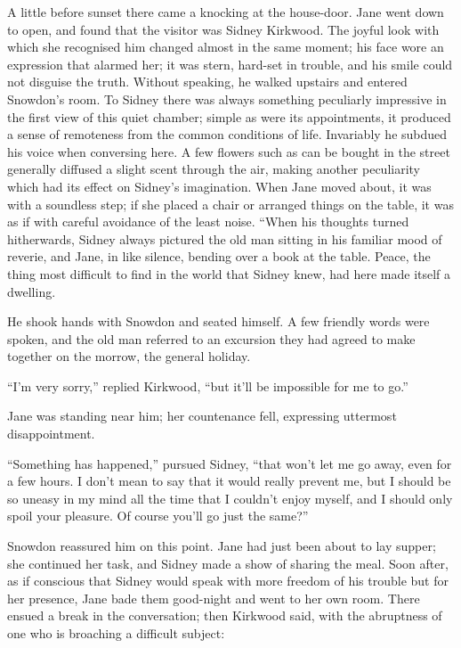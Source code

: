 A little before sunset there came a knocking at the house-door. Jane
went down to open, and found that the visitor was Sidney Kirkwood. The
joyful look with which she recognised him changed almost in the same
moment; his face wore an expression that alarmed her; it was stern,
hard-set in trouble, and his smile could not disguise the truth. Without
speaking, he walked upstairs and entered Snowdon's room. To Sidney there
was always something peculiarly impressive in the first view of this
quiet chamber; simple as were its appointments, it produced a sense {}of
remoteness from the common conditions of life. Invariably he subdued his
voice when conversing here. A few flowers such as can be bought in the
street generally diffused a slight scent through the air, making another
peculiarity which had its effect on Sidney's imagination. When Jane
moved about, it was with a soundless step; if she placed a chair or
arranged things on the table, it was as if with careful avoidance of the
least noise. ``When his thoughts turned hitherwards, Sidney always
pictured the old man sitting in his familiar mood of reverie, and Jane,
in like silence, bending over a book at the table. Peace, the thing most
difficult to find in the world that Sidney knew, had here made itself a
dwelling.

He shook hands with Snowdon and seated himself. A few friendly words
were spoken, and the old man referred to an excursion they had agreed to
make together on the morrow, the general holiday.

``I'm very sorry,'' replied Kirkwood, ``but it'll be impossible for me
to go.''

{}Jane was standing near him; her countenance fell, expressing uttermost
disappointment.

``Something has happened,'' pursued Sidney, ``that won't let me go away,
even for a few hours. I don't mean to say that it would really prevent
me, but I should be so uneasy in my mind all the time that I couldn't
enjoy myself, and I should only spoil your pleasure. Of course you'll go
just the same?''

Snowdon reassured him on this point. Jane had just been about to lay
supper; she continued her task, and Sidney made a show of sharing the
meal. Soon after, as if conscious that Sidney would speak with more
freedom of his trouble but for her presence, Jane bade them good-night
and went to her own room. There ensued a break in the conversation; then
Kirkwood said, with the abruptness of one who is broaching a difficult
subject:


